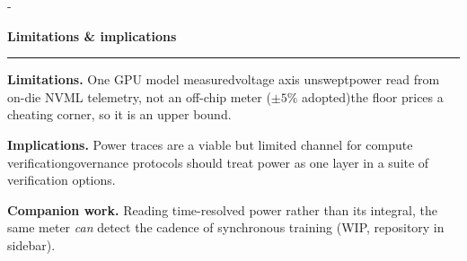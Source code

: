 \documentclass[final]{beamer}
\newlength{\sidebarwidth}\setlength{\sidebarwidth}{0.325\paperwidth}
\newlength{\mainpad}\setlength{\mainpad}{2.8cm}
\newcommand{\sectionfont}{\rmfamily\bfseries\fontsize{36}{42}\selectfont}
\newcommand{\postersection}[1]{%
  \vspace{0.35cm}%
  {\color{matsmaroon}\sectionfont #1\par}%
  \vspace{0.12cm}%
  {\color{matsmaroon}\rule{\linewidth}{2pt}\par}%
  \vspace{0.35cm}}
\newcommand{\redsep}{\;{\color{matsmaroon}\textbullet}\;}
\begin{document}
\begin{frame}[t]
\begin{columns}[T]
\begin{column}{\dimexpr\paperwidth-\sidebarwidth\relax}
\begin{minipage}[t][0.93\paperheight][t]{\dimexpr\paperwidth-\sidebarwidth-2\mainpad\relax}
\postersection{Limitations \& implications}
\textbf{Limitations.} One GPU model measured\redsep voltage axis
unswept\redsep power read from on-die NVML telemetry, not an off-chip
meter ($\pm5\%$ adopted)\redsep the floor prices a cheating corner, so it
is an upper bound.

\vspace{0.25cm}
\textbf{Implications.} Power traces are a viable but limited channel for
compute verification\redsep governance protocols should treat power as
one layer in a suite of verification options.

\vspace{0.25cm}
\textbf{Companion work.} Reading time-resolved power rather than its
integral, the same meter \emph{can} detect the cadence of synchronous
training (WIP, repository in sidebar).

\end{minipage}
\end{column}

\end{columns}
\end{frame}
\end{document}
